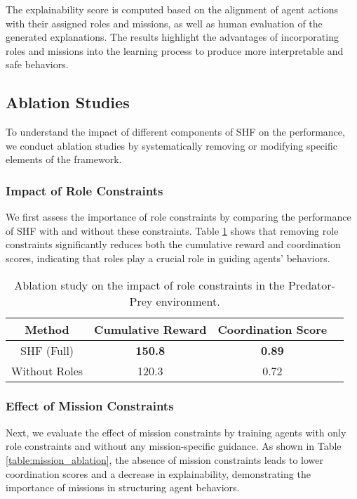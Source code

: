 \documentclass[sigconf,anonymous]{aamas}
\begin{document}
The explainability score is computed based on the alignment of agent actions with their assigned roles and missions, as well as human evaluation of the generated explanations. The results highlight the advantages of incorporating roles and missions into the learning process to produce more interpretable and safe behaviors.

\subsection{Ablation Studies}
To understand the impact of different components of SHF on the performance, we conduct ablation studies by systematically removing or modifying specific elements of the framework.

\subsubsection{Impact of Role Constraints}
We first assess the importance of role constraints by comparing the performance of SHF with and without these constraints. Table \ref{table:role_ablation} shows that removing role constraints significantly reduces both the cumulative reward and coordination scores, indicating that roles play a crucial role in guiding agents' behaviors.

\begin{table}[ht]
\centering
\caption{Ablation study on the impact of role constraints in the Predator-Prey environment.}
\label{table:role_ablation}
\begin{tabular}{|c|c|c|c|}
\hline
\textbf{Method} & \textbf{Cumulative Reward} & \textbf{Coordination Score} \\ \hline
SHF (Full) & \textbf{150.8} & \textbf{0.89} \\ \hline
Without Roles & 120.3 & 0.72 \\ \hline
\end{tabular}
\end{table}

\subsubsection{Effect of Mission Constraints}
Next, we evaluate the effect of mission constraints by training agents with only role constraints and without any mission-specific guidance. As shown in Table \ref{table:mission_ablation}, the absence of mission constraints leads to lower coordination scores and a decrease in explainability, demonstrating the importance of missions in structuring agent behaviors.
\end{document}
